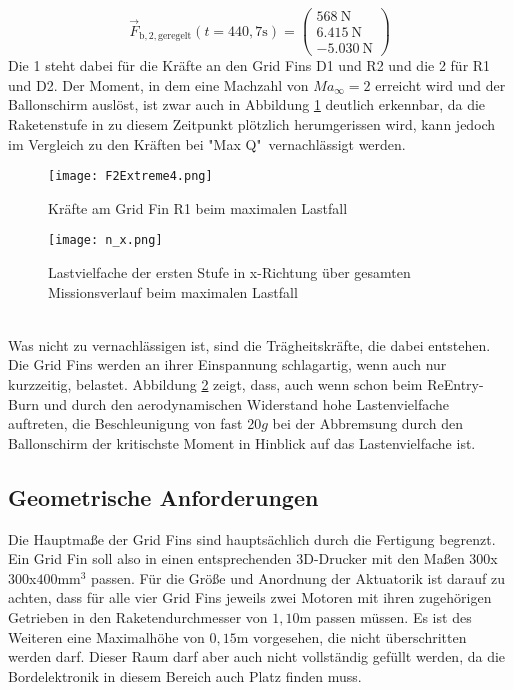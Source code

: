 \begin{equation}\label{eq_Fmax2}
\vec{F}_\mathrm{b, 2, geregelt}(t=440,7\mathrm{s})
=\left(\begin{array}{r}568\mathrm{\ N}\\6.415\mathrm{\ N}\\-5.030\mathrm{\ N}\end{array}\right)
\end{equation}
Die 1 steht dabei für die Kräfte an den Grid Fins D1 und R2 und die 2 für R1 und D2.
Der Moment, in dem eine Machzahl von $Ma_\infty = 2$ erreicht wird und der Ballonschirm auslöst, ist zwar auch in Abbildung \ref{abb_FExtreme} deutlich erkennbar, da die Raketenstufe in zu diesem Zeitpunkt plötzlich herumgerissen wird, kann jedoch im Vergleich zu den Kräften bei "Max Q"\ vernachlässigt werden.
\begin{figure}[h] 
	\centering
	\texttt{[image: F2Extreme4.png]}
	\caption{Kräfte am Grid Fin R1 beim maximalen Lastfall}
	\label{abb_FExtreme}
\end{figure}
\begin{figure}[h] 
\centering
\texttt{[image: n\_x.png]}
\caption{Lastvielfache der ersten Stufe in x-Richtung über gesamten Missionsverlauf beim maximalen Lastfall}
\label{abb_n_x}
\end{figure}\\
Was nicht zu vernachlässigen ist, sind die Trägheitskräfte, die dabei entstehen. Die Grid Fins werden an ihrer Einspannung schlagartig, wenn auch nur kurzzeitig, belastet. Abbildung \ref{abb_n_x} zeigt, dass, auch wenn schon beim ReEntry-Burn und durch den aerodynamischen Widerstand hohe Lastenvielfache auftreten, die Beschleunigung von fast 20$g$ bei der Abbremsung durch den Ballonschirm der kritischste Moment in Hinblick auf das Lastenvielfache ist.
\subsection{Geometrische Anforderungen}
Die Hauptmaße der Grid Fins sind hauptsächlich durch die Fertigung begrenzt. Ein Grid Fin soll also in einen entsprechenden 3D-Drucker mit den Maßen $300$x$300$x$400\mathrm{mm}^3$ passen. Für die Größe und Anordnung der Aktuatorik ist darauf zu achten, dass für alle vier Grid Fins jeweils zwei Motoren mit ihren zugehörigen Getrieben in den Raketendurchmesser von $1,10$m passen müssen. Es ist des Weiteren eine Maximalhöhe von $0,15$m vorgesehen, die nicht überschritten werden darf. Dieser Raum darf aber auch nicht vollständig gefüllt werden, da die Bordelektronik in diesem Bereich auch Platz finden muss.
